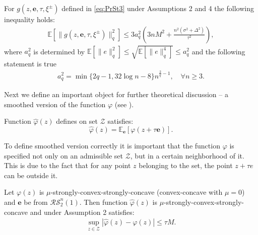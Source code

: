 \documentclass[runningheads]{llncs}
\newcommand{\EE}{\mathbf{E}}
\def\EE{\mathbb E}
\begin{document}
\begin{lemma} 
\label{beznos}
    For $g(z, \mathbf{e}, \tau,  \xi^{\pm})$ defined in \eqref{eq:PrSt3} under Assumptions 2 and 4 the following inequality holds:
    \begin{eqnarray}
    \label{boundlem0}
        \mathbb{E}\left[ \|g(z, \mathbf{e}, \tau,  \xi^{\pm})\|^2_q\right] \leq 3a_q^2 \left(3nM^2+ \frac{n^2(\sigma^2 + \Delta^2)}{\tau^2} \right),
    \end{eqnarray}
    where $a^2_q$ is determined by $\EE[\|e\|_q^2] \leq \sqrt{\EE[\|e\|_q^4]} \le a^2_q$ and the following statement is true
    \begin{eqnarray}
    a_q^2 = \min\{2q - 1, 32 \log n - 8\} n^{\frac{2}{q} - 1}, \quad \forall n \geq 3.\label{eq:condition_on_u}
\end{eqnarray}
\end{lemma}

Next we define an important object for further theoretical discussion -- a smoothed version of the function $\varphi$ (see \cite{Nesterov,Shamir15}). 

\begin{definition}
Function $\hat{\varphi}(z)$ defines on set $\mathcal{Z}$ satisfies:
\begin{equation}
    \label{eq:smoothphi}
    \hat{\varphi}(z) = \mathbb{E}_{\mathbf{e}}\left[\varphi(z+ \tau \mathbf{e}) \right].
\end{equation}
\end{definition}

To define smoothed version correctly it is important that the function $\varphi$  is specified not only on an admissible set $\mathcal{Z}$, but in a certain neighborhood of it. This is due to the fact that for any point $z$ belonging to the set, the point $z+\tau e$ can be outside it.

\begin{lemma}\label{lemma1}
    Let ${\varphi}(z)$ is $\mu$-strongly-convex-strongly-concave (convex-concave with $\mu = 0$) and $\mathbf{e}$ be from $\mathcal{RS}^n_2(1)$. Then function $\hat{\varphi}(z)$ is $\mu$-strongly-convex-strongly-concave  and under Assumption 2 satisfies:
    \begin{eqnarray}
        \label{lemma1_0}
        \sup_{z \in \mathcal{Z}} |\hat{\varphi}(z) - {\varphi}(z)| \leq \tau M. 
    \end{eqnarray}
\end{lemma}
\end{document}
